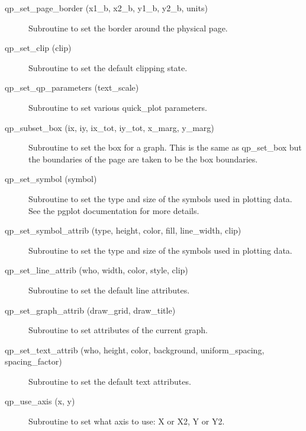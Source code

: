 \begin{description}
\item[qp\_set\_page\_border (x1\_b, x2\_b, y1\_b, y2\_b, units)] \Newline 
     Subroutine to set the border around the physical page.

\item[qp\_set\_clip (clip)] \Newline 
     Subroutine to set the default clipping state.

\item[qp\_set\_qp\_parameters (text\_scale)] \Newline 
Subroutine to set various quick\_plot parameters.

\item[qp\_subset\_box (ix, iy, ix\_tot, iy\_tot, x\_marg, y\_marg)] \Newline 
     Subroutine to set the box for a graph. This is the same as
     qp\_set\_box but the boundaries of the page are taken to be the box boundaries.

\item[qp\_set\_symbol (symbol)] \Newline 
     Subroutine to set the type and size of the symbols used in plotting data.
     See the pgplot documentation for more details.

\item[qp\_set\_symbol\_attrib (type, height, color, fill, line\_width, clip)] \Newline 
     Subroutine to set the type and size of the symbols used in plotting data.

\item[qp\_set\_line\_attrib (who, width, color, style, clip)] \Newline 
     Subroutine to set the default line attributes.

\item[qp\_set\_graph\_attrib (draw\_grid, draw\_title)] \Newline 
     Subroutine to set attributes of the current graph.

\item[qp\_set\_text\_attrib (who, height, color, background, 
                                uniform\_spacing, spacing\_factor) ] \Newline 
     Subroutine to set the default text attributes.

\item[qp\_use\_axis (x, y)] \Newline 
Subroutine to set what axis to use: X or X2, Y or Y2.

\end{description}

